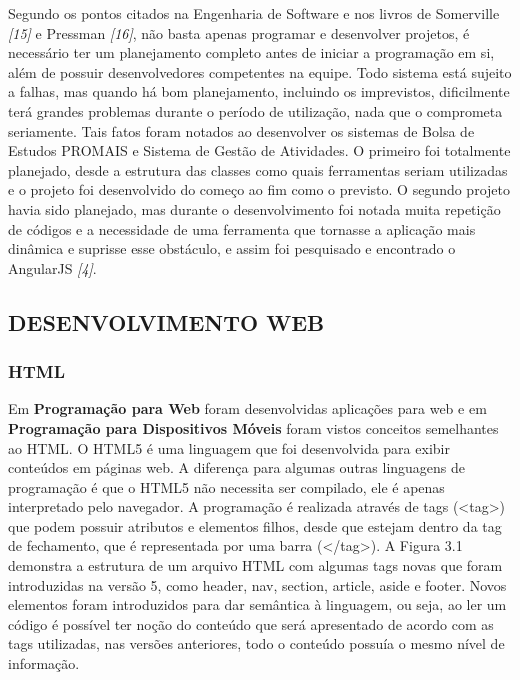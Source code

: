 \documentclass[
  12pt,				%
  openany,
  oneside,
  a4paper,			%
  english,			%
  brazil
]{article}
\numberwithin{figure}{section}
\numberwithin{table}{section}
\begin{document}
Segundo os pontos citados na Engenharia de Software e nos livros de Somerville \textit{[15]} e Pressman \textit{[16]}, não basta apenas programar e desenvolver projetos, é necessário ter um planejamento completo antes de iniciar a programação em si, além de possuir desenvolvedores competentes na equipe. Todo sistema está sujeito a falhas, mas quando há bom planejamento, incluindo os imprevistos, dificilmente terá grandes problemas durante o período de utilização, nada que o comprometa seriamente. Tais fatos foram notados ao desenvolver os sistemas de Bolsa de Estudos PROMAIS e Sistema de Gestão de Atividades. O primeiro foi totalmente planejado, desde a estrutura das classes como quais ferramentas seriam utilizadas e o projeto foi desenvolvido do começo ao fim como o previsto. O segundo projeto havia sido planejado, mas durante o desenvolvimento foi notada muita repetição de códigos e a necessidade de uma ferramenta que tornasse a aplicação mais dinâmica e suprisse esse obstáculo, e assim foi pesquisado e encontrado o AngularJS \textit{[4]}.




\subsection{DESENVOLVIMENTO WEB}

\subsubsection{HTML}

Em \textbf{Programação para Web} foram desenvolvidas aplicações para web e em \textbf{Programação para Dispositivos Móveis} foram vistos conceitos semelhantes ao HTML. O HTML5 é uma linguagem que foi desenvolvida para exibir conteúdos em páginas web. A diferença para algumas outras linguagens de programação é que o HTML5 não necessita ser compilado, ele é apenas interpretado pelo navegador. A programação é realizada através de tags (<tag>) que podem possuir atributos e elementos filhos, desde que estejam dentro da tag de fechamento, que é representada por uma barra (</tag>). A Figura 3.1 demonstra a estrutura de um arquivo HTML com algumas tags novas que foram introduzidas na versão 5, como header, nav, section, article, aside e footer. Novos elementos foram introduzidos para dar semântica à linguagem, ou seja, ao ler um código é possível ter noção do conteúdo que será apresentado de acordo com as tags utilizadas, nas versões anteriores, todo o conteúdo possuía o mesmo nível de informação.
\end{document}
